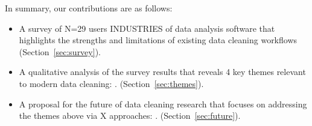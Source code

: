 In summary, our contributions are as follows:
\begin{itemize}
\item A survey of N=29 users INDUSTRIES of data analysis software that highlights the strengths and limitations of existing data cleaning workflows (Section~\ref{sec:survey}).
\item A qualitative analysis of the survey results that reveals 4 key themes relevant to modern data cleaning: . (Section~\ref{sec:themes}).
\item A proposal for the future of data cleaning research that focuses on addressing the themes above via X approaches: .  (Section~\ref{sec:future}).
\end{itemize}
